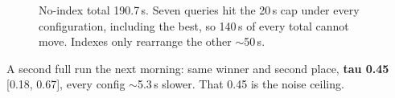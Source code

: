 \documentclass[11pt,a4paper]{article}
\begin{document}
\begin{figure}[htbp]
\centering
{}
\caption{No-index total 190.7\,s. Seven queries hit the 20\,s cap under every configuration, including the best, so 140\,s of every total cannot move. Indexes only rearrange the other $\sim$50\,s.}
\end{figure}

A second full run the next morning: same winner and second place, \textbf{tau 0.45} [0.18, 0.67], every config $\sim$5.3\,s slower. That 0.45 is the noise ceiling.
\end{document}
